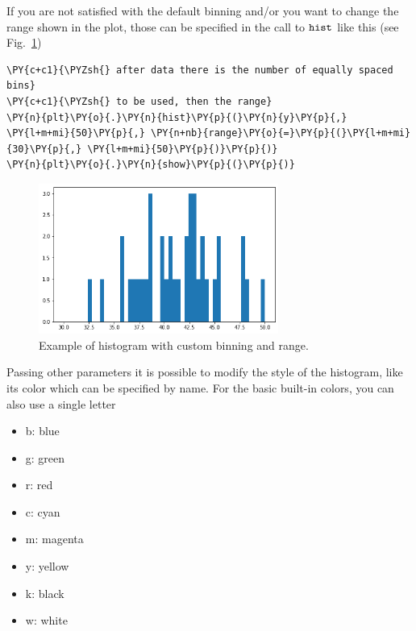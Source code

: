 If you are not satisfied with the default binning and/or you want to
change the range shown in the plot, those can be specified in the call
to \(\tt{hist}\) like this (see Fig.~\ref{fig:histo2})

\begin{tcolorbox}[breakable, size=fbox, boxrule=1pt, pad at break*=1mm,colback=cellbackground, colframe=cellborder]
\begin{Verbatim}[commandchars=\\\{\}]
\PY{c+c1}{\PYZsh{} after data there is the number of equally spaced bins}
\PY{c+c1}{\PYZsh{} to be used, then the range}
\PY{n}{plt}\PY{o}{.}\PY{n}{hist}\PY{p}{(}\PY{n}{y}\PY{p}{,} \PY{l+m+mi}{50}\PY{p}{,} \PY{n+nb}{range}\PY{o}{=}\PY{p}{(}\PY{l+m+mi}{30}\PY{p}{,} \PY{l+m+mi}{50}\PY{p}{)}\PY{p}{)}
\PY{n}{plt}\PY{o}{.}\PY{n}{show}\PY{p}{(}\PY{p}{)}
\end{Verbatim}
\end{tcolorbox}

\begin{figure}[htb]
	\centering
	\includegraphics[width=0.7\textwidth]{figures/histo2}
	\caption{Example of histogram with custom binning and range.}
	\label{fig:histo2}
\end{figure}

Passing other parameters it is possible to modify the style of the
histogram, like its color which can be specified by name. For
the basic built-in colors, you can also use a single letter

\begin{itemize}
	\tightlist
	\item
	b: blue
	\item
	g: green
	\item
	r: red
	\item
	c: cyan
	\item
	m: magenta
	\item
	y: yellow
	\item
	k: black
	\item
	w: white
\end{itemize}

